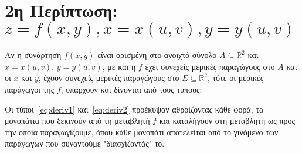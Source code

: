 \section{2η Περίπτωση: \ensuremath{z=f(x,y),  x=x(u,v),  y=y(u,v)}} 

\begin{thm}
  Αν η συνάρτηση $ f(x,y) $ είναι ορισμένη στο ανοιχτό σύνολο 
  $ A \subseteq \mathbb{R}^{2} $ και $ x = x(u,v) $, $ y=y(u,v) $, με 
  και η $f$ έχει συνεχείς μερικές παραγώγους στο $A$ και οι $ x $ και $ y $, έχουν 
  συνεχείς μερικές παραγώγους στο $ E \subseteq \mathbb{R}^{2} $,
  τότε οι μερικές παράγωγοι της $f$, υπάρχουν και δίνονται από τους τύπους:
\end{thm}


\begin{rem}
  Οι τύποι~\eqref{eq:deriv1} και~\eqref{eq:deriv2} προέκυψαν αθροίζοντας κάθε φορά, 
  τα μονοπάτια που ξεκινούν από τη μεταβλητή $f$ και καταλήγουν στη μεταβλητή ως προς 
  την οποία παραγωγίζουμε, όπου κάθε 
  μονοπάτι αποτελείται από το γινόμενο των παραγώγων που συναντούμε "διασχίζοντάς" το.
\end{rem}


